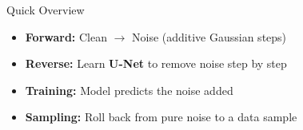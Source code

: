 \begin{frame}{Quick Overview}
    \begin{itemize}
        \item \textbf{Forward:} Clean $\rightarrow$ Noise (additive Gaussian steps)
        \item \textbf{Reverse:} Learn \textbf{U-Net} to remove noise step by step
        \item \textbf{Training:} Model predicts the noise added
        \item \textbf{Sampling:} Roll back from pure noise to a data sample
    \end{itemize}
\end{frame}
